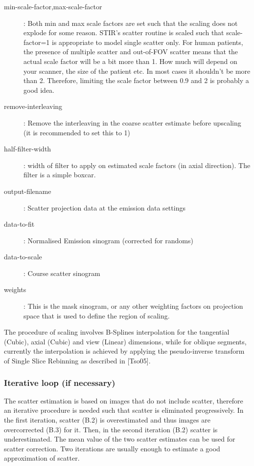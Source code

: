 \documentclass{article}
\begin{document}
\begin{description}
\item[min-scale-factor,max-scale-factor]: Both min and max scale factors are set such that the scaling does not explode for some reason. 
STIR's scatter routine is scaled such that scale-factor=1 is appropriate to model single scatter only. 
For human patients, the presence of multiple scatter and out-of-FOV scatter means that the actual 
scale factor will be a bit more than 1. How much will depend
on your scanner, the size of the patient etc. In most cases it shouldn't be
more than 2. Therefore, limiting the scale factor between 0.9 and 2 is probably a good idea.
\item[remove-interleaving]: Remove the interleaving in the coarse scatter estimate before upscaling (it is recommended to set this to 1)
\item[half-filter-width]: width of filter to apply on estimated scale factors (in axial direction). The filter is a simple boxcar.
\item[output-filename]: Scatter projection data at the emission data settings
\item[data-to-fit]: Normalised Emission sinogram (corrected for randoms) 
\item[data-to-scale]: Course scatter sinogram 
\item[weights]: This is the mask sinogram, or any other weighting factors on projection space that is used to define the region of scaling. 
\end{description}
The procedure of scaling involves B-Splines interpolation for the tangential (Cubic), axial (Cubic) and
view (Linear) dimensions, while for oblique segments, currently the interpolation is achieved by applying the
pseudo-inverse transform of Single Slice Rebinning as described in [Tso05].

\subsubsection{Iterative loop (if necessary)}
The scatter estimation is based on images that do not include scatter, therefore an iterative procedure
is needed such that scatter is eliminated progressively. In the first iteration, scatter (B.2) is
overestimated and thus images are overcorrected (B.3) for it. Then, in the second iteration (B.2) scatter
is underestimated. The mean value of the two scatter estimates can be used for scatter correction. Two
iterations are usually enough to estimate a good approximation of scatter.
\end{document}
